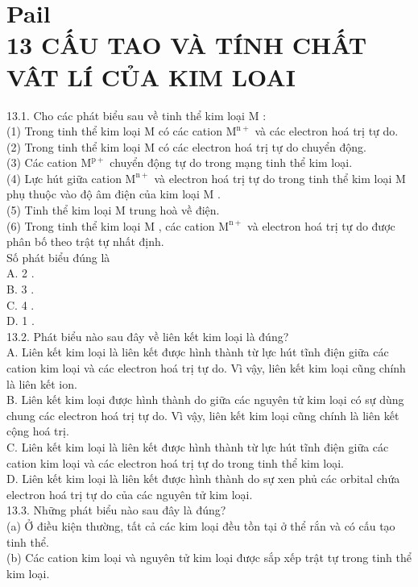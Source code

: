 \documentclass[10pt]{article}
\begin{document}
\section*{Pail \\
 13 CẤU TAO VÀ TÍNH CHẤT VÂT LÍ CỦA KIM LOAI}
13.1. Cho các phát biểu sau về tinh thể kim loại M :\\
(1) Trong tinh thể kim loại M có các cation $\mathrm{M}^{\mathrm{n}+}$ và các electron hoá trị tự do.\\
(2) Trong tinh thể kim loại M có các electron hoá trị tự do chuyển động.\\
(3) Các cation $\mathrm{M}^{\mathrm{p}+}$ chuyển động tự do trong mạng tinh thể kim loại.\\
(4) Lực hút giữa cation $\mathrm{M}^{\mathrm{n}+}$ và electron hoá trị tự do trong tinh thể kim loại M phụ thuộc vào độ âm điện của kim loại M .\\
(5) Tinh thể kim loại M trung hoà về điện.\\
(6) Trong tinh thể kim loại M , các cation $\mathrm{M}^{\mathrm{n}+}$ và electron hoá trị tự do được phân bố theo trật tự nhất định.\\
Số phát biểu đúng là\\
A. 2 .\\
B. 3 .\\
C. 4 .\\
D. 1 .\\
13.2. Phát biểu nào sau đây về liên kết kim loại là đúng?\\
A. Liên kết kim loại là liên kết được hình thành từ lực hút tĩnh điện giữa các cation kim loại và các electron hoá trị tự do. Vì vậy, liên kết kim loại cũng chính là liên kết ion.\\
B. Liên kết kim loại được hình thành do giữa các nguyên tử kim loại có sự dùng chung các electron hoá trị tự do. Vì vậy, liên kết kim loại cũng chính là liên kết cộng hoá trị.\\
C. Liên kết kim loại là liên kết được hình thành từ lực hút tĩnh điện giữa các cation kim loại và các electron hoá trị tự do trong tinh thể kim loại.\\
D. Liên kết kim loại là liên kết được hình thành do sự xen phủ các orbital chứa electron hoá trị tự do của các nguyên tử kim loại.\\
13.3. Những phát biểu nào sau đây là đúng?\\
(a) Ở điều kiện thường, tất cả các kim loại đều tồn tại ở thể rắn và có cấu tạo tinh thể.\\
(b) Các cation kim loại và nguyên tử kim loại được sắp xếp trật tự trong tinh thể kim loại.\\
\end{document}
